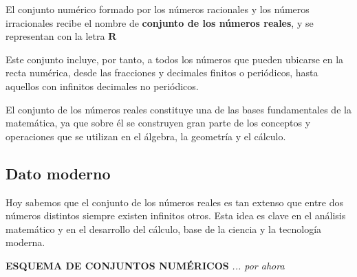 \vspace{-1.5ex}
\vspace{-1ex}

El conjunto numérico formado por los números racionales y los números
irracionales recibe el nombre de \textbf{conjunto de los números reales}, 
y se representan con la letra $\mathbf{R}$  

Este conjunto incluye, por tanto, a todos los números que pueden ubicarse
en la recta numérica, desde las fracciones y decimales finitos o periódicos,
hasta aquellos con infinitos decimales no periódicos.  

El conjunto de los números reales constituye una de las bases fundamentales de 
la matemática, ya que sobre él se construyen gran parte de los conceptos y 
operaciones que se utilizan en el álgebra, la geometría y el cálculo.

\subsection*{Dato moderno}
Hoy sabemos que el conjunto de los números reales es tan extenso que entre dos números 
distintos siempre existen infinitos otros. Esta idea es clave en el análisis matemático 
y en el desarrollo del cálculo, base de la ciencia y la tecnología moderna.

\begin{center}
\textbf{ESQUEMA DE CONJUNTOS NUMÉRICOS} \textit{... por ahora}
\end{center}





